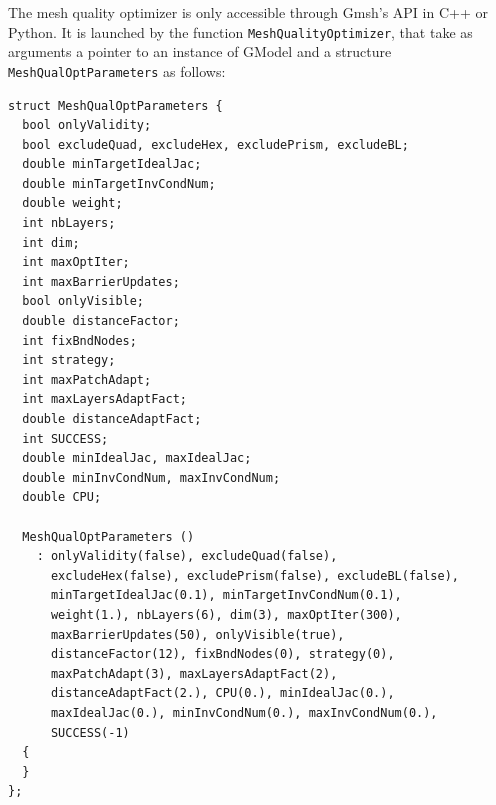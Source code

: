 \documentclass[12pt,a4paper,a4wide]{article}
\begin{document}
The mesh quality optimizer is only accessible through Gmsh's API
in C++ or Python. It is launched by the function
\texttt{MeshQualityOptimizer}, that take as arguments a pointer to
an instance of GModel and a structure \texttt{MeshQualOptParameters}
as follows:
\begin{verbatim}
struct MeshQualOptParameters {
  bool onlyValidity;
  bool excludeQuad, excludeHex, excludePrism, excludeBL;
  double minTargetIdealJac;
  double minTargetInvCondNum;
  double weight;
  int nbLayers;
  int dim;
  int maxOptIter;
  int maxBarrierUpdates;
  bool onlyVisible;
  double distanceFactor;
  int fixBndNodes;
  int strategy;
  int maxPatchAdapt;
  int maxLayersAdaptFact;
  double distanceAdaptFact;
  int SUCCESS;
  double minIdealJac, maxIdealJac;
  double minInvCondNum, maxInvCondNum;
  double CPU;

  MeshQualOptParameters ()
    : onlyValidity(false), excludeQuad(false),
      excludeHex(false), excludePrism(false), excludeBL(false),
      minTargetIdealJac(0.1), minTargetInvCondNum(0.1),
      weight(1.), nbLayers(6), dim(3), maxOptIter(300),
      maxBarrierUpdates(50), onlyVisible(true),
      distanceFactor(12), fixBndNodes(0), strategy(0),
      maxPatchAdapt(3), maxLayersAdaptFact(2),
      distanceAdaptFact(2.), CPU(0.), minIdealJac(0.),
      maxIdealJac(0.), minInvCondNum(0.), maxInvCondNum(0.),
      SUCCESS(-1)
  {
  }
};
\end{verbatim}
\end{document}
